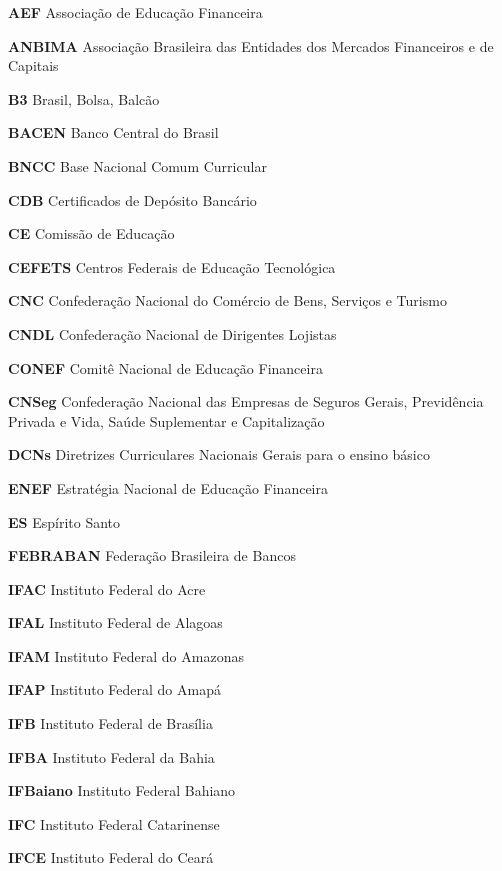 
\begin{siglas}
    \item[\textbf{AEF}] Associação de Educação Financeira
    \item[\textbf{ANBIMA}] Associação Brasileira das Entidades dos Mercados Financeiros e de Capitais
    \item[\textbf{B3}] Brasil, Bolsa, Balcão
    \item[\textbf{BACEN}] Banco Central do Brasil
    \item[\textbf{BNCC}] Base Nacional Comum Curricular
    \item[\textbf{CDB}] Certificados de Depósito Bancário
    \item[\textbf{CE}] Comissão de Educação
    \item[\textbf{CEFETS}] Centros Federais de Educação Tecnológica
    \item[\textbf{CNC}] Confederação Nacional do Comércio de Bens, Serviços e Turismo 
    \item[\textbf{CNDL}] Confederação Nacional de Dirigentes Lojistas
    \item[\textbf{CONEF}] Comitê Nacional de Educação Financeira
    \item[\textbf{CNSeg}] Confederação Nacional das Empresas de Seguros Gerais, Previdência Privada e Vida, Saúde Suplementar e Capitalização
    \item[\textbf{DCNs}] Diretrizes Curriculares Nacionais Gerais para o ensino básico
    \item[\textbf{ENEF}] Estratégia Nacional de Educação Financeira
    \item[\textbf{ES}] Espírito Santo
    \item[\textbf{FEBRABAN}] Federação Brasileira de Bancos
    \item[\textbf{IFAC}] Instituto Federal do Acre
    \item[\textbf{IFAL}] Instituto Federal de Alagoas
    \item[\textbf{IFAM}] Instituto Federal do Amazonas
    \item[\textbf{IFAP}] Instituto Federal do Amapá
    \item[\textbf{IFB}] Instituto Federal de Brasília
    \item[\textbf{IFBA}] Instituto Federal da Bahia
    \item[\textbf{IFBaiano}] Instituto Federal Bahiano
    \item[\textbf{IFC}] Instituto Federal Catarinense
    \item[\textbf{IFCE}] Instituto Federal do Ceará

\end{siglas}
